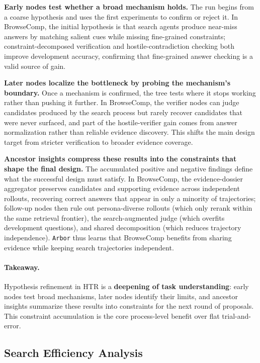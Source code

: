 \documentclass[]{selfevolagent}
\theoremstyle{plain}
\theoremstyle{definition}
\theoremstyle{remark}
\newcommand{\arbor}{\texttt{Arbor}}
\begin{document}
\textbf{Early nodes test whether a broad mechanism holds.}
The run begins from a coarse hypothesis and uses the first experiments to confirm or reject it. In BrowseComp, the initial hypothesis is that search agents produce near-miss answers by matching salient cues while missing fine-grained constraints; constraint-decomposed verification and hostile-contradiction checking both improve development accuracy, confirming that fine-grained answer checking is a valid source of gain.
 
\textbf{Later nodes localize the bottleneck by probing the mechanism's boundary.}
Once a mechanism is confirmed, the tree tests where it stops working rather than pushing it further. In BrowseComp, the verifier nodes can judge candidates produced by the search process but rarely recover candidates that were never surfaced, and part of the hostile-verifier gain comes from answer normalization rather than reliable evidence discovery. This shifts the main design target from stricter verification to broader evidence coverage.
 
\textbf{Ancestor insights compress these results into the constraints that shape the final design.}
The accumulated positive and negative findings define what the successful design must satisfy. In BrowseComp, the evidence-dossier aggregator preserves candidates and supporting evidence across independent rollouts, recovering correct answers that appear in only a minority of trajectories; follow-up nodes then rule out persona-diverse rollouts (which only rerank within the same retrieval frontier), the search-augmented judge (which overfits development questions), and shared decomposition (which reduces trajectory independence). \arbor{} thus learns that BrowseComp benefits from sharing evidence while keeping search trajectories independent.
 
\paragraph{Takeaway.}
Hypothesis refinement in HTR is a \textbf{deepening of task understanding}: early nodes test broad mechanisms, later nodes identify their limits, and ancestor insights summarize these results into constraints for the next round of proposals. This constraint accumulation is the core process-level benefit over flat trial-and-error.
 
\subsection{Search Efficiency Analysis}
\label{sec:discussion-timing}
 
\end{document}
